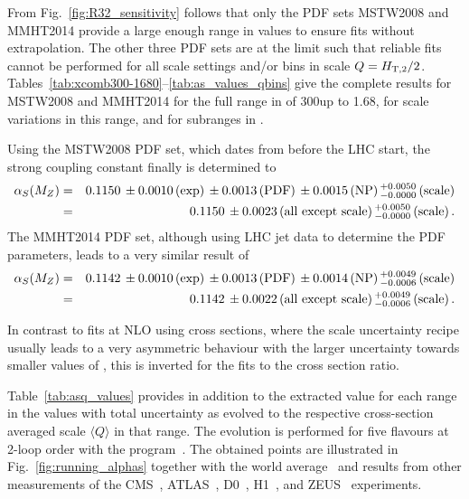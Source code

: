 From Fig.~\ref{fig:R32_sensitivity} follows that only the PDF sets MSTW2008 and MMHT2014 provide a large enough range in \alpsmz values to ensure fits without extrapolation. The other three PDF sets are at the limit such that reliable fits cannot be performed for all scale settings and/or bins in scale $Q=H_{\mathrm{T,2}}/2$. Tables~\ref{tab:xcomb300-1680}--\ref{tab:as_values_qbins} give the complete results for MSTW2008 and MMHT2014 for the full range in \httwo of 300\GeV up to 1.68\TeV, for scale variations in this range, and for subranges in \httwo.

Using the MSTW2008 PDF set, which dates from before the LHC start, the strong coupling constant finally is determined to
%
\begin{eqnarray*}
  \alpha_S(M_Z) &=& 0.1150\,\pm0.0010\,\textrm{(exp)}\,\pm0.0013\,\textrm{(PDF)}\,\pm0.0015\,\textrm{(NP)}\,^{+0.0050}_{-0.0000}\,\textrm{(scale)}\\
  &=& 0.1150\,\pm0.0023\,\textrm{(all except scale)}\,^{+0.0050}_{-0.0000}\,\textrm{(scale)}\,.
\end{eqnarray*}
%
The MMHT2014 PDF set, although using LHC jet data to determine the PDF
parameters, leads to a very similar result of
\begin{eqnarray*}
  \alpha_S(M_Z) &=& 0.1142\,\pm0.0010\,\textrm{(exp)}\,\pm0.0013\,\textrm{(PDF)}\,\pm0.0014\,\textrm{(NP)}\,^{+0.0049}_{-0.0006}\,\textrm{(scale)}\\
  &=& 0.1142\,\pm0.0022\,\textrm{(all except scale)}\,^{+0.0049}_{-0.0006}\,\textrm{(scale)}\,.
\end{eqnarray*}

In contrast to fits at NLO using cross sections, where the scale uncertainty recipe usually leads to a very asymmetric behaviour with the larger uncertainty towards smaller values of \alpsmz, this is inverted for the fits to the cross section ratio.

Table~\ref{tab:asq_values} provides in addition to the extracted \alpsmz value for each range in \httwo the \alpsq values with total uncertainty as evolved to the respective cross-section averaged scale $\langle{}Q\rangle$ in that range. The evolution is performed for five flavours at 2-loop order with the \RunDec program~\cite{Chetyrkin:2000yt, Schmidt:2012az}. The obtained \alpsq points are illustrated in Fig.~\ref{fig:running_alphas} together with the world average~\cite{Patrignani:2016xmw} and results from other measurements of the CMS~\cite{Chatrchyan:2013txa, Chatrchyan:2013haa, Khachatryan:2014waa, CMS:2014mna, Khachatryan:2016mlc}, ATLAS~\cite{ATLAS:2015yaa}, D0~\cite{Abazov:2009nc, Abazov:2012lua}, H1~\cite{Andreev:2014wwa, Andreev:2016tgi}, and ZEUS~\cite{Abramowicz:2012jz} experiments.

